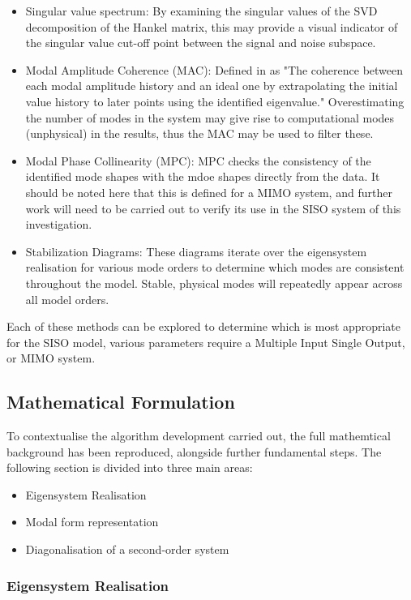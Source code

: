 \begin{itemize}
    \item Singular value spectrum: By examining the singular values of the SVD decomposition of the Hankel matrix, this may provide a visual indicator of the singular value cut-off point between the signal and noise subspace.
    \item Modal Amplitude Coherence (MAC): Defined in \cite{era} as "The coherence between each modal amplitude history and an ideal one by extrapolating the initial value history to later points using the identified eigenvalue." Overestimating the number of modes in the system may give rise to computational modes (unphysical) in the results, thus the MAC may be used to filter these.
    \item Modal Phase Collinearity (MPC): MPC checks the consistency of the identified mode shapes with the mdoe shapes directly from the data. It should be noted here that this is defined for a MIMO system, and further work will need to be carried out to verify its use in the SISO system of this investigation.
    \item Stabilization Diagrams: These diagrams iterate over the eigensystem realisation for various mode orders to determine which modes are consistent throughout the model. Stable, physical modes will repeatedly appear across all model orders.
\end{itemize}

Each of these methods can be explored to determine which is most appropriate for the SISO model, various parameters require a Multiple Input Single Output, or MIMO system.

\subsection{Mathematical Formulation}
\label{sec:maths}

To contextualise the algorithm development carried out, the full mathemtical background has been reproduced, alongside further fundamental steps. The following section is divided into three main areas:

\begin{itemize}
    \item Eigensystem Realisation
    \item Modal form representation
    \item Diagonalisation of a second-order system
\end{itemize}

\subsubsection{Eigensystem Realisation}
\label{sec:era-proof}

